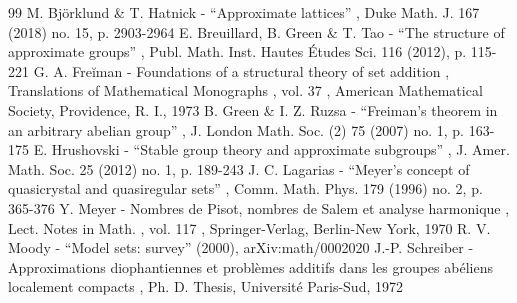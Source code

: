 \documentclass[10pt]{amsart}
\theoremstyle{plain}
\theoremstyle{definition}
\begin{document}
\begin{thebibliography}{99}
 M. Björklund \& T. Hatnick - “Approximate lattices” , Duke Math. J. 167 (2018) no. 15, p. 2903-2964
 E. Breuillard, B. Green \& T. Tao - “The structure of approximate groups” , Publ. Math. Inst. Hautes Études Sci. 116 (2012), p. 115-221
 G. A. Freĭman - Foundations of a structural theory of set addition , Translations of Mathematical Monographs , vol. 37 , American Mathematical Society, Providence, R. I., 1973
 B. Green \& I. Z. Ruzsa - “Freiman’s theorem in an arbitrary abelian group” , J. London Math. Soc. (2) 75 (2007) no. 1, p. 163-175
 E. Hrushovski - “Stable group theory and approximate subgroups” , J. Amer. Math. Soc. 25 (2012) no. 1, p. 189-243
 J. C. Lagarias - “Meyer’s concept of quasicrystal and quasiregular sets” , Comm. Math. Phys. 179 (1996) no. 2, p. 365-376
 Y. Meyer - Nombres de Pisot, nombres de Salem et analyse harmonique , Lect. Notes in Math. , vol. 117 , Springer-Verlag, Berlin-New York, 1970
 R. V. Moody - “Model sets: survey” (2000), arXiv:math/0002020
 J.-P. Schreiber - Approximations diophantiennes et problèmes additifs dans les groupes abéliens localement compacts , Ph. D. Thesis, Université Paris-Sud, 1972
\end{thebibliography}
\end{document}
